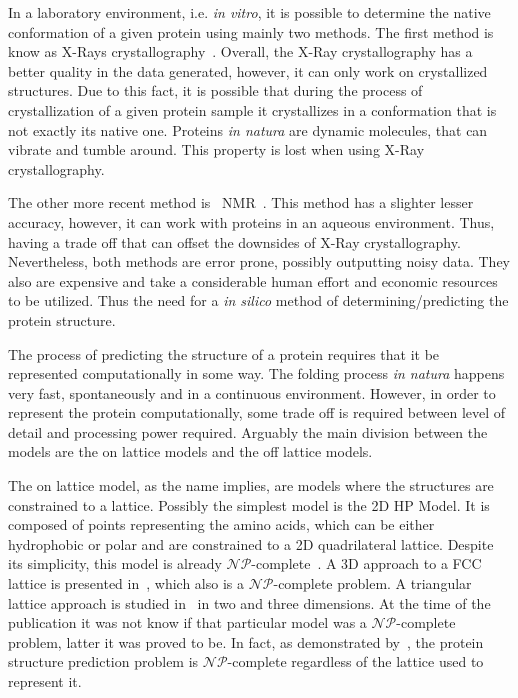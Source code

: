 
In a laboratory environment, i.e. \textit{in vitro}, it is possible to
determine the native conformation of a given protein using mainly two methods.
The first method is know as X-Rays crystallography~\cite{nelson2008lehninger}.
Overall, the X-Ray crystallography has a better quality in the data generated,
however, it can only work on crystallized structures. Due to this fact, it is
possible that during the process of crystallization of a given protein sample
it crystallizes in a conformation that is not exactly its native one. Proteins
\textit{in natura} are dynamic molecules, that can vibrate and tumble around.
This property is lost when using X-Ray crystallography.

The other more recent method is ~\ac{NMR}~\cite{nelson2008lehninger}. This
method has a slighter lesser accuracy, however, it can work with proteins in an
aqueous environment. Thus, having a trade off that can offset the downsides of
X-Ray crystallography. Nevertheless, both methods are error prone, possibly
outputting noisy data. They also are expensive and take a considerable human
effort and economic resources to be utilized.  Thus the need for a \textit{in
silico} method of determining/predicting the protein structure.

The process of predicting the structure of a protein requires that it be
represented computationally in some way. The folding process \textit{in natura}
happens very fast, spontaneously and in a continuous environment. However, in
order to represent the protein computationally, some trade off is required
between level of detail and processing power required. Arguably the main
division between the models are the on lattice models and the off lattice
models.

The on lattice model, as the name implies, are models where the structures are
constrained to a lattice. Possibly the simplest model is the 2D \ac{HP} Model.
It is composed of points representing the amino acids, which can be either
hydrophobic or polar and are constrained to a 2D quadrilateral lattice. Despite
its simplicity, this model is already
$\mathcal{NP}$-complete~\cite{berger1998protein}. A 3D approach to a \ac{FCC}
lattice is presented in~\cite{hoque2007protein}, which also is a
$\mathcal{NP}$-complete problem. A triangular lattice approach is studied
in~\cite{agarwala1997local} in two and three dimensions. At the time of the
publication it was not know if that particular model was a
$\mathcal{NP}$-complete problem, latter it was proved to be. In fact, as
demonstrated by~\cite{hart1997robust}, the protein structure prediction problem
is $\mathcal{NP}$-complete regardless of the lattice used to represent it.

